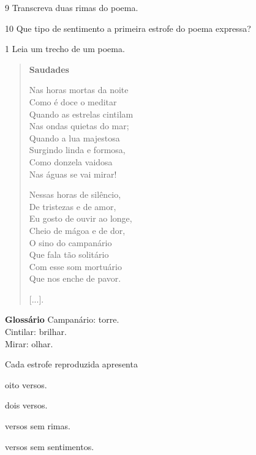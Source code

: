 \num{9} Transcreva duas rimas do poema.



\num{10} Que tipo de sentimento a primeira estrofe do poema expressa?




\num{1} Leia um trecho de um poema.

\begin{quote}
\textbf{Saudades}

Nas horas mortas da noite\\
Como é doce o meditar\\
Quando as estrelas cintilam\\
Nas ondas quietas do mar;\\
Quando a lua majestosa\\
Surgindo linda e formosa,\\
Como donzela vaidosa\\
Nas águas se vai mirar!

Nessas horas de silêncio,\\
De tristezas e de amor,\\
Eu gosto de ouvir ao longe,\\
Cheio de mágoa e de dor,\\
O sino do campanário\\
Que fala tão solitário\\
Com esse som mortuário\\
Que nos enche de pavor.

{[}...{]}.

\end{quote}

\textbf{Glossário}
Campanário: torre.\\
Cintilar: brilhar.\\
Mirar: olhar.

Cada estrofe reproduzida apresenta

\begin{escolha}
\item oito versos.

\item dois versos.

\item versos sem rimas.

\item versos sem sentimentos.
\end{escolha}

